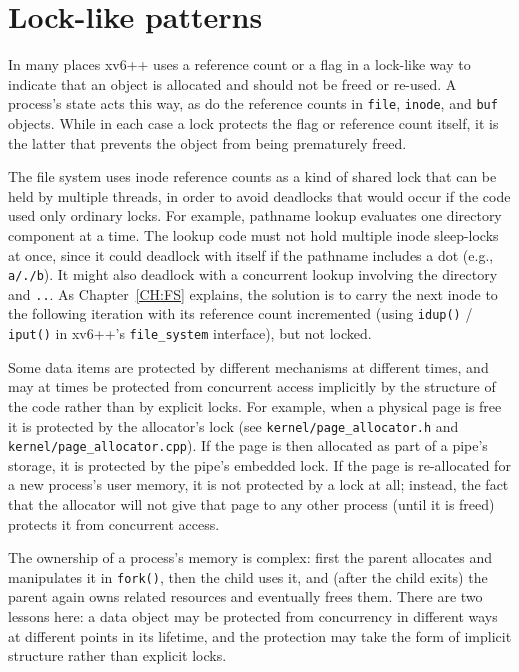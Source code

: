 \section{Lock-like patterns}

In many places xv6++ uses a reference count or a flag in a lock-like way to
indicate that an object is allocated and should not be freed or re-used.
A process's state acts this way, as do the reference counts in
\lstinline{file}, \lstinline{inode}, and \lstinline{buf} objects.
While in each case a lock protects the flag or reference count itself,
it is the latter that prevents the object from being prematurely freed.

The file system uses inode reference counts as a kind of shared lock that can
be held by multiple threads, in order to avoid deadlocks that would occur if
the code used only ordinary locks.
For example, pathname lookup evaluates one directory component at a time.
The lookup code must not hold multiple inode sleep-locks at once, since it could
deadlock with itself if the pathname includes a dot (e.g., \lstinline{a/./b}).
It might also deadlock with a concurrent lookup involving the directory and
\lstinline{..}. As Chapter~\ref{CH:FS} explains, the solution is to carry the
next inode to the following iteration with its reference count incremented
(using \lstinline{idup()} / \lstinline{iput()} in xv6++'s \lstinline{file_system}
interface), but not locked.

Some data items are protected by different mechanisms at different times, and
may at times be protected from concurrent access implicitly by the structure of
the code rather than by explicit locks.
For example, when a physical page is free it is protected by the allocator's
lock (see \texttt{kernel/page\_allocator.h} and \texttt{kernel/page\_allocator.cpp}).
If the page is then allocated as part of a pipe's storage, it is protected by
the pipe's embedded lock. If the page is re-allocated for a new process's user
memory, it is not protected by a lock at all; instead, the fact that the
allocator will not give that page to any other process (until it is freed)
protects it from concurrent access.

The ownership of a process's memory is complex:
first the parent allocates and manipulates it in \lstinline{fork()},
then the child uses it, and (after the child exits) the parent again
owns related resources and eventually frees them.
There are two lessons here: a data object may be protected from concurrency in
different ways at different points in its lifetime, and the protection may take
the form of implicit structure rather than explicit locks.

